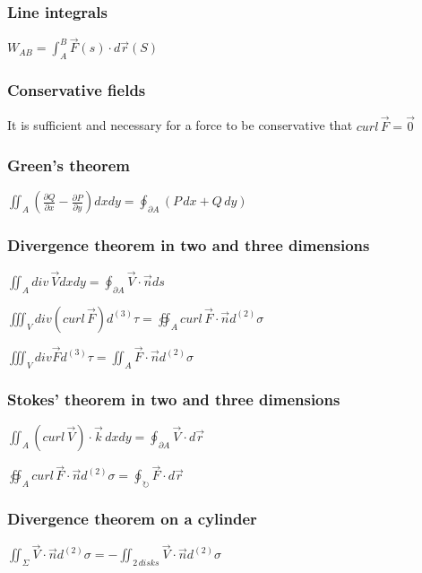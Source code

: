 \documentclass{article}
\begin{document}
\subsubsection{Line integrals}
$W_{AB}=\displaystyle\int_A^B\vec{F}(s)\cdot d\vec{r}(S)$

\subsubsection{Conservative fields}
It is sufficient and necessary for a force to be conservative that $curl\,\vec{F}=\vec{0}$

\subsubsection{Green's theorem}
$\displaystyle\iint_A \left(\frac{\partial Q}{\partial x} - \frac{\partial P}{\partial y}\right)dxdy = \displaystyle\oint_{\partial A} (P\, dx + Q \, dy)$

\subsubsection{Divergence theorem in two and three dimensions}
$\displaystyle\iint_A div \, \vec{V}dxdy = \displaystyle\oint_{\partial A}\vec{V}\cdot \vec{n} ds$

\vspace{2pt}

\noindent$\displaystyle\iiint_V div (curl \, \vec{F})d^{(3)}\tau = \displaystyle\oiint_A curl \, \vec{F} \cdot \vec{n} d^{(2)}\sigma$

\vspace{2pt}

\noindent$\displaystyle\iiint_V div \vec{F}d^{(3)}\tau = \displaystyle\iint_A\vec{F}\cdot\vec{n}d^{(2)}\sigma$

\subsubsection{Stokes' theorem in two and three dimensions}
$\displaystyle\iint_A (curl \, \vec{V}) \cdot \vec{k}\, dx dy = \displaystyle\oint_{\partial A} \vec{V}\cdot d\vec{r}$

\noindent$\displaystyle\oiint_A curl \, \vec{F} \cdot \vec{n} d^{(2)}\sigma = \displaystyle\oint_{\circlearrowright}\vec{F}\cdot d \vec{r}$

\subsubsection{Divergence theorem on a cylinder}
$\displaystyle\iint_\Sigma \vec{V}\cdot \vec{n} d^{(2)}\sigma = - \displaystyle\iint_{2\,disks} \vec{V}\cdot\vec{n} d^{(2)}\sigma$
\end{document}
